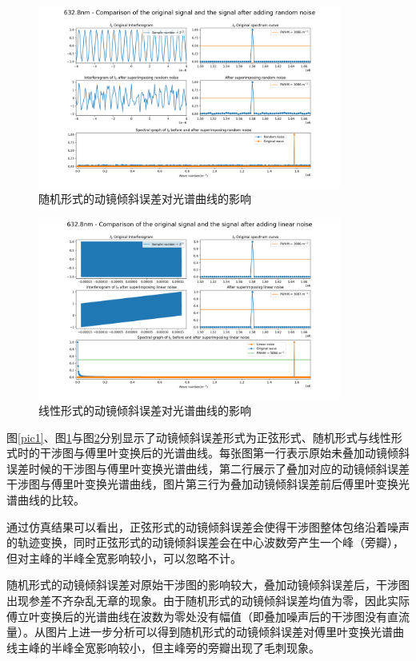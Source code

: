 \documentclass[conference]{IEEEtran}
\begin{document}
\begin{figure}[htbp]
	\centerline{
		\includegraphics[width=10cm]{2.png} 	
	}
	\caption{随机形式的动镜倾斜误差对光谱曲线的影响}
	\label{pic2}
\end{figure}

\begin{figure}[htbp]
	\centerline{
		\includegraphics[width=10cm]{3.png} 	
	}
	\caption{线性形式的动镜倾斜误差对光谱曲线的影响}
	\label{pic3}
\end{figure}

图\ref{pic1}、图\ref{pic2}与图\ref{pic3}分别显示了动镜倾斜误差形式为正弦形式、随机形式与线性形式时的干涉图与傅里叶变换后的光谱曲线。每张图第一行表示原始未叠加动镜倾斜误差时候的干涉图与傅里叶变换光谱曲线，第二行展示了叠加对应的动镜倾斜误差干涉图与傅里叶变换光谱曲线，图片第三行为叠加动镜倾斜误差前后傅里叶变换光谱曲线的比较。

通过仿真结果可以看出，正弦形式的动镜倾斜误差会使得干涉图整体包络沿着噪声的轨迹变换，同时正弦形式的动镜倾斜误差会在中心波数旁产生一个峰（旁瓣），但对主峰的半峰全宽影响较小，可以忽略不计。

随机形式的动镜倾斜误差对原始干涉图的影响较大，叠加动镜倾斜误差后，干涉图出现参差不齐杂乱无章的现象。由于随机形式的动镜倾斜误差均值为零，因此实际傅立叶变换后的光谱曲线在波数为零处没有幅值（即叠加噪声后的干涉图没有直流量）。从图片上进一步分析可以得到随机形式的动镜倾斜误差对傅里叶变换光谱曲线主峰的半峰全宽影响较小，但主峰旁的旁瓣出现了毛刺现象。
\end{document}
